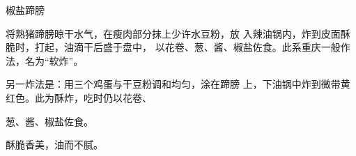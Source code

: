 \begin{recipe}{椒盐蹄膀}

\ingredients


\cooking

将熟猪蹄膀晾干水气，在瘦肉部分抹上少许水豆粉，放 入辣油锅内，炸到皮面酥脆时，打起，油滴干后盛于盘中， 以花卷、葱、酱、椒盐佐食。此系重庆一般作法，名为“软炸”。

另一炸法是：用三个鸡蛋与干豆粉调和均匀，涂在蹄膀 上，下油锅中炸到微带黄红色。此为酥炸，吃时仍以花卷、

葱、酱、椒盐佐食。

\notes

酥脆香美，油而不腻。

\end{recipe}


